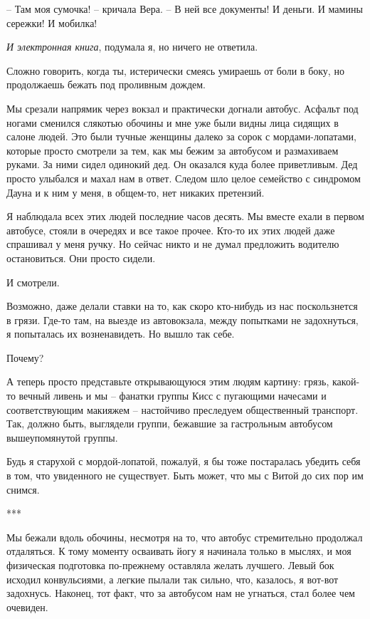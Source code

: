 \documentclass[
]{book}
\begin{document}
-- Там моя сумочка! -- кричала Вера. -- В ней все документы! И деньги. И мамины сережки! И мобилка!

\emph{И электронная книга}, подумала я, но ничего не ответила.

Сложно говорить, когда ты, истерически смеясь умираешь от боли в боку, но продолжаешь бежать под проливным дождем.

Мы срезали напрямик через вокзал и практически догнали автобус. Асфальт под ногами сменился слякотью обочины и мне уже были видны лица сидящих в салоне людей. Это были тучные женщины далеко за сорок с мордами-лопатами, которые просто смотрели за тем, как мы бежим за автобусом и размахиваем руками. За ними сидел одинокий дед. Он оказался куда более приветливым. Дед просто улыбался и махал нам в ответ. Следом шло целое семейство с синдромом Дауна и к ним у меня, в общем-то, нет никаких претензий.

Я наблюдала всех этих людей последние часов десять. Мы вместе ехали в первом автобусе, стояли в очередях и все такое прочее. Кто-то их этих людей даже спрашивал у меня ручку. Но сейчас никто и не думал предложить водителю остановиться. Они просто сидели.

И смотрели.

Возможно, даже делали ставки на то, как скоро кто-нибудь из нас поскользнется в грязи. Где-то там, на выезде из автовокзала, между попытками не задохнуться, я попыталась их возненавидеть. Но вышло так себе.

Почему?

А теперь просто представьте открывающуюся этим людям картину: грязь, какой-то вечный ливень и мы -- фанатки группы Кисс с пугающими начесами и соответствующим макияжем -- настойчиво преследуем общественный транспорт. Так, должно быть, выглядели группи, бежавшие за гастрольным автобусом вышеупомянутой группы.

Будь я старухой с мордой-лопатой, пожалуй, я бы тоже постаралась убедить себя в том, что увиденного не существует. Быть может, что мы с Витой до сих пор им снимся.

***

Мы бежали вдоль обочины, несмотря на то, что автобус стремительно продолжал отдаляться. К тому моменту осваивать йогу я начинала только в мыслях, и моя физическая подготовка по-прежнему оставляла желать лучшего. Левый бок исходил конвульсиями, а легкие пылали так сильно, что, казалось, я вот-вот задохнусь. Наконец, тот факт, что за автобусом нам не угнаться, стал более чем очевиден.
\end{document}
